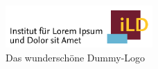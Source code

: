 \documentclass{beamer}
\begin{document}
\begin{frame}[plain]
\maketitle
\end{frame}


\begin{frame}
  \begin{figure}
    \includegraphics[width=0.5\textwidth]{dummy_institut.pdf}
    \caption{Das wunderschöne Dummy-Logo}
  \end{figure}
\end{frame}
\end{document}
